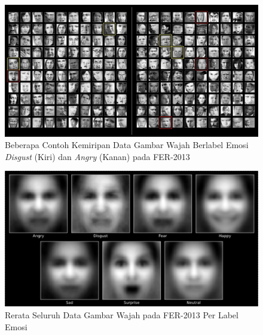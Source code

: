 \begin{figure}[t]
    \centering
    \includegraphics[width=14cm]{gambar/fer2013_disgustvsangry.png}
    \caption{Beberapa Contoh Kemiripan Data Gambar Wajah Berlabel Emosi \textit{Disgust} (Kiri) dan \textit{Angry} (Kanan) pada FER-2013}
    \label{fig:disgustvsangry}
\end{figure}
\begin{figure}[t]
    \centering
    \includegraphics[width=14cm]{gambar/fer2013_rerata_gambar_per_label.png}
    \caption{Rerata Seluruh Data Gambar Wajah pada FER-2013 Per Label Emosi}
    \label{fig:reratagambarfer2013}
\end{figure}
